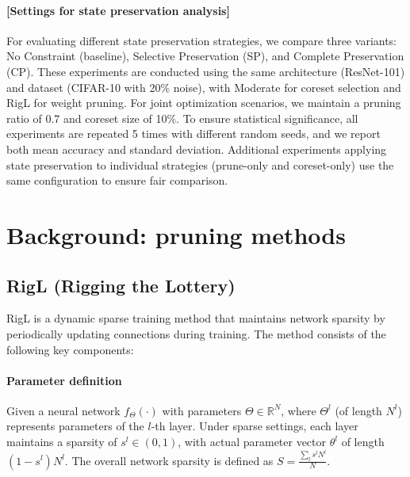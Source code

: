 \paragraph{[Settings for state preservation analysis]}  
For evaluating different state preservation strategies, we compare three variants: No Constraint (baseline), Selective Preservation (SP), and Complete Preservation (CP). These experiments are conducted using the same architecture (ResNet-101) and dataset (CIFAR-10 with 20\% noise), with Moderate for coreset selection and RigL for weight pruning. For joint optimization scenarios, we maintain a pruning ratio of 0.7 and coreset size of 10\%. To ensure statistical significance, all experiments are repeated 5 times with different random seeds, and we report both mean accuracy and standard deviation. Additional experiments applying state preservation to individual strategies (prune-only and coreset-only) use the same configuration to ensure fair comparison.  

\section{Background: pruning methods}
\label{appendix:used_pruning_method}
\subsection{RigL (Rigging the Lottery)}
RigL is a dynamic sparse training method that maintains network sparsity by periodically updating connections during training. The method consists of the following key components:

\paragraph{Parameter definition} Given a neural network $f_{\Theta}(\cdot)$ with parameters $\Theta \in \mathbb{R}^N$, where $\Theta^l$ (of length $N^l$) represents parameters of the $l$-th layer. Under sparse settings, each layer maintains a sparsity of $s^l \in (0,1)$, with actual parameter vector $\theta^l$ of length $(1-s^l)N^l$. The overall network sparsity is defined as $S=\frac{\sum_l s^lN^l}{N}$.

